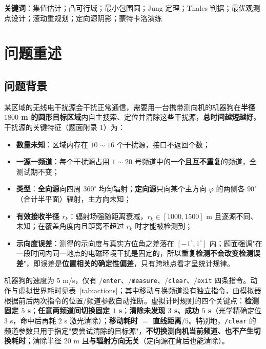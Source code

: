 \documentclass[11pt,a4paper]{ctexart}
\begin{document}
\vspace{0.6em}
\noindent\textbf{关键词}：集值估计；凸可行域；最小包围圆；Jung 定理；Thales 判据；最优观测点设计；滚动重规划；定向源阴影；蒙特卡洛演练
\newpage

\section{问题重述}

\subsection{问题背景}

某区域的无线电干扰源会干扰正常通信，需要用一台携带测向机的机器狗在\textbf{半径 $1800$ m 的圆形目标区域}内自主搜索、定位并清除这些干扰源，\textbf{总时间越短越好}。干扰源的关键特征（题面附录 1）为：

\begin{itemize}
  \item \textbf{数量未知}：区域内存在 $10\!\sim\!16$ 个干扰源，接口不返回个数；
  \item \textbf{一源一频道}：每个干扰源占用 $1\!\sim\!20$ 号频道中的\textbf{一个且互不重复}的频道，全测试期不变；
  \item \textbf{类型}：\textbf{全向源}向四周 $360^\circ$ 均匀辐射；\textbf{定向源}只向某个主方向 $\varphi$ 的两侧各 $90^\circ$（合计半平面）辐射，主方向未知；
  \item \textbf{有效接收半径 $r_k$}：辐射场强随距离衰减，$r_k\in[1000,1500]$ m 且逐源不同、未知；在覆盖角度内且距离不超过 $r_k$ 时才能被检测到；
  \item \textbf{示向度误差}：测得的示向度与真实方位角之差落在 $[-1^\circ,1^\circ]$ 内；题面强调"在一段时间内同一地点的电磁环境干扰是固定的，所以\textbf{重复检测不会改变检测误差}"，即误差是\textbf{位置相关的确定性偏差}，只有跨地点看才呈统计规律。
\end{itemize}

机器狗的速度为 $5$ m/s，仅有 $/$\texttt{enter}、$/$\texttt{measure}、$/$\texttt{clear}、$/$\texttt{exit} 四条指令。动作与虚拟世界耗时见表~\ref{tab:actions}；其中移动与换频道没有独立指令，由模拟器根据前后两次指令的位置/频道参数自动推断。虚拟计时规则的四个关键点：\textbf{检测固定 $5$ s}；\textbf{任意两频道间切换固定 $1$ s}；\textbf{清除未发现 $3$ s、成功 $5$ s}（光学精确定位 $3$ s，命中后再耗 $2$ s 激光清除）；\textbf{移动耗时 $=$ 直线距离$/5$}。特别地，\texttt{/clear} 的频道参数只用于指定"要尝试清除的目标源"，\textbf{不切换测向机当前频道、也不产生切换耗时}；清除半径 $20$ m 且\textbf{与辐射方向无关}（定向源在背后也能清除）。
\end{document}
